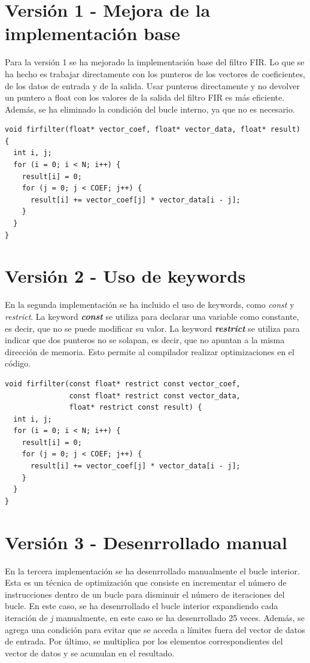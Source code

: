 \documentclass[11pt]{report}
\begin{document}
\newpage

\section{Versión 1 - Mejora de la implementación base}
Para la versión 1 se ha mejorado la implementación base del filtro FIR. Lo que se ha hecho es trabajar directamente con los punteros de los vectores de coeficientes,
de los datos de entrada y de la salida. Usar punteros directamente y no devolver un puntero a float con los valores de la salida del filtro FIR es más eficiente. Además, 
se ha eliminado la condición del bucle interno, ya que no es necesario.

\begin{lstlisting}
void firfilter(float* vector_coef, float* vector_data, float* result) {
  int i, j;
  for (i = 0; i < N; i++) {
    result[i] = 0;
    for (j = 0; j < COEF; j++) {
      result[i] += vector_coef[j] * vector_data[i - j];
    }
  }
}
\end{lstlisting}


\section{Versión 2 - Uso de keywords}
En la segunda implementación se ha incluido el uso de keywords, como \emph{const} y \emph{restrict}. La keyword \emph{\textbf{const}} se utiliza para declarar
una variable como constante, es decir, que no se puede modificar su valor. La keyword \emph{\textbf{restrict}} se utiliza para indicar que dos punteros no se solapan,
es decir, que no apuntan a la misma dirección de memoria. Esto permite al compilador realizar optimizaciones en el código.

\begin{lstlisting}
void firfilter(const float* restrict const vector_coef,
               const float* restrict const vector_data,
               float* restrict const result) {
  int i, j;
  for (i = 0; i < N; i++) {
    result[i] = 0;
    for (j = 0; j < COEF; j++) {
      result[i] += vector_coef[j] * vector_data[i - j];
    }
  }
}
\end{lstlisting}

\newpage

\section{Versión 3 - Desenrrollado manual}
En la tercera implementación se ha desenrrollado manualmente el bucle interior. Esta es un técnica de optimización que consiste en incrementar
el número de instrucciones dentro de un bucle para disminuir el número de iteraciones del bucle. En este caso, se ha desenrrollado el bucle interior
expandiendo cada iteración de \emph{j} manualmente, en este caso se ha desenrrollado 25 veces. Además, se agrega una condición para evitar que se acceda
a límites fuera del vector de datos de entrada. Por último, se multiplica por los elementos correspondientes del vector de datos y se acumulan en el resultado.
\end{document}
